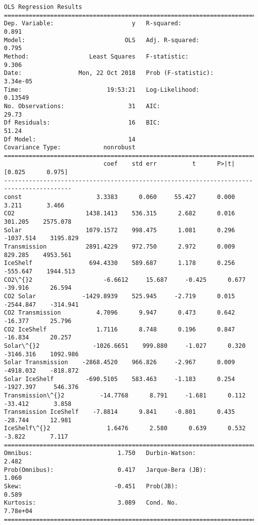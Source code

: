 \documentclass[11pt]{article}
\begin{document}
    \begin{Verbatim}[commandchars=\\\{\}]
                            OLS Regression Results                            
==============================================================================
Dep. Variable:                      y   R-squared:                       0.891
Model:                            OLS   Adj. R-squared:                  0.795
Method:                 Least Squares   F-statistic:                     9.306
Date:                Mon, 22 Oct 2018   Prob (F-statistic):           3.34e-05
Time:                        19:53:21   Log-Likelihood:                0.13549
No. Observations:                  31   AIC:                             29.73
Df Residuals:                      16   BIC:                             51.24
Df Model:                          14                                         
Covariance Type:            nonrobust                                         
=========================================================================================
                            coef    std err          t      P>|t|      [0.025      0.975]
-----------------------------------------------------------------------------------------
const                     3.3383      0.060     55.427      0.000       3.211       3.466
CO2                    1438.1413    536.315      2.682      0.016     301.205    2575.078
Solar                  1079.1572    998.475      1.081      0.296   -1037.514    3195.829
Transmission           2891.4229    972.750      2.972      0.009     829.285    4953.561
IceShelf                694.4330    589.687      1.178      0.256    -555.647    1944.513
CO2\^{}2                    -6.6612     15.687     -0.425      0.677     -39.916      26.594
CO2 Solar             -1429.8939    525.945     -2.719      0.015   -2544.847    -314.941
CO2 Transmission          4.7096      9.947      0.473      0.642     -16.377      25.796
CO2 IceShelf              1.7116      8.748      0.196      0.847     -16.834      20.257
Solar\^{}2               -1026.6651    999.880     -1.027      0.320   -3146.316    1092.986
Solar Transmission    -2868.4520    966.826     -2.967      0.009   -4918.032    -818.872
Solar IceShelf         -690.5105    583.463     -1.183      0.254   -1927.397     546.376
Transmission\^{}2          -14.7768      8.791     -1.681      0.112     -33.412       3.858
Transmission IceShelf    -7.8814      9.841     -0.801      0.435     -28.744      12.981
IceShelf\^{}2                1.6476      2.580      0.639      0.532      -3.822       7.117
==============================================================================
Omnibus:                        1.750   Durbin-Watson:                   2.482
Prob(Omnibus):                  0.417   Jarque-Bera (JB):                1.060
Skew:                          -0.451   Prob(JB):                        0.589
Kurtosis:                       3.089   Cond. No.                     7.78e+04
==============================================================================


\end{Verbatim}
\end{document}
